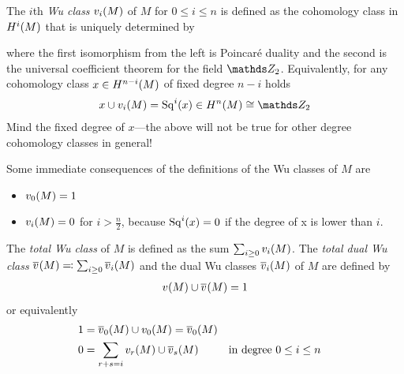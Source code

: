 \begin{Def}\label{def:wuclasses}
  The $i$th \emph{Wu class} ${v_{i}}(M)$ of $M$ for $0\leq i\leq n$ is defined
  as the cohomology class in $H^i(M)$ that is uniquely determined by
  \begin{center}
  \end{center}
  where the first isomorphism from the left is Poincaré duality
  and the second is the universal coefficient theorem
  for the field $\Zmod2$.
  Equivalently, for any cohomology class $x\in H^{n-i}(M)$ of fixed
  degree $n-i$ holds
  \begin{gather*}
    x\cup \v{i}{M} = \Sq i(x) \in \H^n(M) \cong \Zmod2
  \end{gather*}
  Mind the fixed degree of $x$---the above will not be true for other
  degree cohomology classes in general!
\end{Def}

\begin{Rem}
  Some immediate consequences of the definitions of the Wu classes of
  $M$ are
  \begin{itemize}
  \item ${v_{0}}(M) = 1$
  \item ${v_{i}}(M) = 0$ for $i>\frac n 2$, because $\mathrm{Sq}^{i}(x) = 0$ if the
    degree of x is lower than $i$.
  \end{itemize}
\end{Rem}


\begin{Def}
  The \emph{total Wu class} of $M$ is defined as the sum
  $\sum_{i\geq0}{v_{i}}(M)$. The \emph{total dual Wu class}
  ${\overline{v}_{}}(M)\eqqcolon \sum_{i\geq 0}{\overline{v}_{i}}(M)$
  and the dual Wu classes ${\overline{v}_{i}}(M)$
  of $M$ are defined by
  \begin{gather*}
    {v_{}}(M) \cup {\overline{v}_{}}(M) = 1
  \end{gather*}
  or equivalently
  \begin{align*}
    1 &= {\overline{v}_{0}}(M) \cup {v_{0}}(M) = {\overline{v}_{0}}(M) \\
    0 &= \sum_{r+s=i}{v_{r}}(M)\cup{\overline{v}_{s}}(M)
      &&\text{in degree $0\leq i\leq n$}
  \end{align*}
\end{Def}

